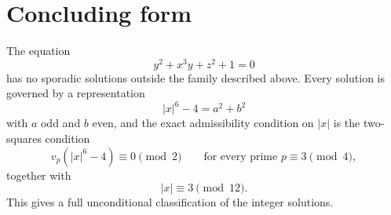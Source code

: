 \documentclass[11pt]{article}
\theoremstyle{definition}
\theoremstyle{remark}
\newcommand{\vp}{v_p}
\begin{document}
\section{Concluding form}

The equation
\[
        y^2+x^3y+z^2+1=0
\]
has no sporadic solutions outside the family described above.  Every solution is governed by a representation
\[
        |x|^6-4=a^2+b^2
\]
with $a$ odd and $b$ even, and the exact admissibility condition on $|x|$ is the two-squares condition
\[
        \vp(|x|^6-4)\equiv0\pmod2
        \qquad\text{for every prime }p\equiv3\pmod4,
\]
together with
\[
        |x|\equiv3\pmod {12}.
\]
This gives a full unconditional classification of the integer solutions.
\end{document}
